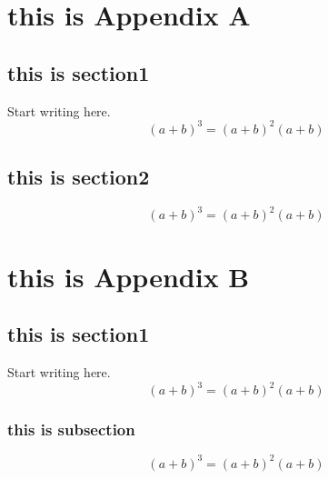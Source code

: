\appendix
\chapter{this is Appendix A}
\section{this is section1}
 Start writing here.
 \begin{equation}
(a+b)^3 = (a+b)^2(a+b)
\end{equation}

\section{this is section2}
\begin{equation}
(a+b)^3 = (a+b)^2(a+b)
\end{equation}

\chapter{this is Appendix B}
\section{this is section1} Start writing here.
\begin{equation}
(a+b)^3 = (a+b)^2(a+b)
\end{equation}

\subsection{this is subsection}
\begin{equation}
(a+b)^3 = (a+b)^2(a+b)
\end{equation}
